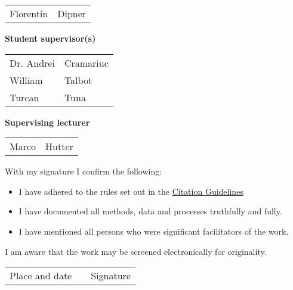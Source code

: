 \begin{tabular}{ p{5cm} p{5cm} }
  Florentin & Dipner \\
\end{tabular}

\vspace{0.5cm}

\textbf{Student supervisor(s)}

\vspace{0.5cm}

\begin{tabular}{ p{5cm} p{5cm} }
    Dr. Andrei & Cramariuc\\
    William & Talbot\\
    Turcan & Tuna \\
\end{tabular}

\vspace{0.5cm}

%
%
%

\textbf{Supervising lecturer}

\vspace{0.5cm}

\begin{tabular}{ p{5cm} p{5cm} }
  Marco & Hutter \\
\end{tabular}

\vspace{0.5cm}

With my signature I confirm the following:
\begin{itemize}
    \item I have adhered to the rules set out in the \href{https://www.ethz.ch/content/dam/ethz/main/education/rechtliches-abschluesse/leistungskontrollen/plagiarism-citationetiquette.pdf}{Citation Guidelines}
    \item I have documented all methods, data and processes truthfully and fully.
    \item I have mentioned all persons who were significant facilitators of the work.
\end{itemize}

\vspace{0.5cm}

I am aware that the work may be screened electronically for originality.

\vspace{2.75cm}

\begin{tabular}{ p{5cm} p{1cm} p{5cm} }
  \cline{1-1} \cline{3-3}
  Place and date & & Signature \\
\end{tabular}
